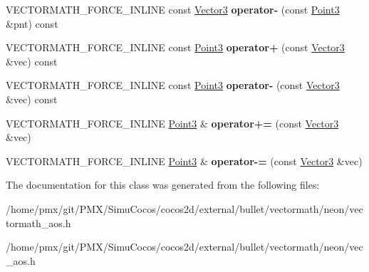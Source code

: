 \begin{DoxyCompactItemize}
\item 
\mbox{\label{classVectormath_1_1Aos_1_1Point3_a03056adfd813ab430597801e23942b65}} 
V\+E\+C\+T\+O\+R\+M\+A\+T\+H\+\_\+\+F\+O\+R\+C\+E\+\_\+\+I\+N\+L\+I\+NE const \hyperlink{classVectormath_1_1Aos_1_1Vector3}{Vector3} {\bfseries operator-\/} (const \hyperlink{classVectormath_1_1Aos_1_1Point3}{Point3} \&pnt) const
\item 
\mbox{\label{classVectormath_1_1Aos_1_1Point3_a563239a9cebed60856f621adaab15d13}} 
V\+E\+C\+T\+O\+R\+M\+A\+T\+H\+\_\+\+F\+O\+R\+C\+E\+\_\+\+I\+N\+L\+I\+NE const \hyperlink{classVectormath_1_1Aos_1_1Point3}{Point3} {\bfseries operator+} (const \hyperlink{classVectormath_1_1Aos_1_1Vector3}{Vector3} \&vec) const
\item 
\mbox{\label{classVectormath_1_1Aos_1_1Point3_afb119a0bf9f478cf9810668b5c579940}} 
V\+E\+C\+T\+O\+R\+M\+A\+T\+H\+\_\+\+F\+O\+R\+C\+E\+\_\+\+I\+N\+L\+I\+NE const \hyperlink{classVectormath_1_1Aos_1_1Point3}{Point3} {\bfseries operator-\/} (const \hyperlink{classVectormath_1_1Aos_1_1Vector3}{Vector3} \&vec) const
\item 
\mbox{\label{classVectormath_1_1Aos_1_1Point3_a2664dac684d9760df08aa1ac58f7179c}} 
V\+E\+C\+T\+O\+R\+M\+A\+T\+H\+\_\+\+F\+O\+R\+C\+E\+\_\+\+I\+N\+L\+I\+NE \hyperlink{classVectormath_1_1Aos_1_1Point3}{Point3} \& {\bfseries operator+=} (const \hyperlink{classVectormath_1_1Aos_1_1Vector3}{Vector3} \&vec)
\item 
\mbox{\label{classVectormath_1_1Aos_1_1Point3_a997776eba517a8f237f5f0e3c48890e1}} 
V\+E\+C\+T\+O\+R\+M\+A\+T\+H\+\_\+\+F\+O\+R\+C\+E\+\_\+\+I\+N\+L\+I\+NE \hyperlink{classVectormath_1_1Aos_1_1Point3}{Point3} \& {\bfseries operator-\/=} (const \hyperlink{classVectormath_1_1Aos_1_1Vector3}{Vector3} \&vec)
\end{DoxyCompactItemize}


The documentation for this class was generated from the following files\+:\begin{DoxyCompactItemize}
\item 
/home/pmx/git/\+P\+M\+X/\+Simu\+Cocos/cocos2d/external/bullet/vectormath/neon/vectormath\+\_\+aos.\+h\item 
/home/pmx/git/\+P\+M\+X/\+Simu\+Cocos/cocos2d/external/bullet/vectormath/neon/vec\+\_\+aos.\+h\end{DoxyCompactItemize}
